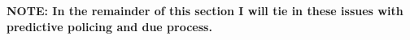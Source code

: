 \documentclass[12pt]{article} %
\begin{document}

\textbf{NOTE: In the remainder of this section I will tie in these issues with predictive policing and due process.}
%
%


\end{document}
